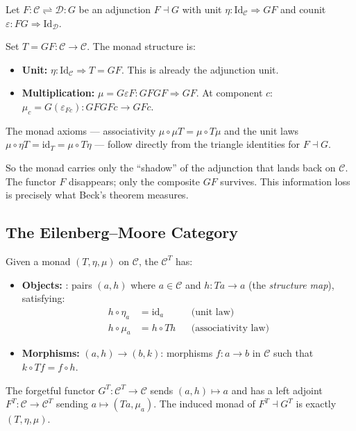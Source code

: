 Let $F : \mathcal{C} \rightleftharpoons \mathcal{D} : G$ be an adjunction
$F \dashv G$ with unit $\eta : \mathrm{Id}_\mathcal{C} \Rightarrow GF$ and
counit $\varepsilon : FG \Rightarrow \mathrm{Id}_\mathcal{D}$.

Set $T = GF : \mathcal{C} \to \mathcal{C}$. The monad structure is:
\begin{itemize}
  \item \textbf{Unit:} $\eta : \mathrm{Id}_\mathcal{C} \Rightarrow T = GF$.
        This is already the adjunction unit.
  \item \textbf{Multiplication:} $\mu = G\varepsilon F : GFGF \Rightarrow GF$.
        At component $c$: $\mu_c = G(\varepsilon_{Fc}) : GF GF c \to GF c$.
\end{itemize}
The monad axioms --- associativity $\mu \circ \mu T = \mu \circ T \mu$ and
the unit laws $\mu \circ \eta T = \mathrm{id}_T = \mu \circ T\eta$ ---
follow directly from the triangle identities for $F \dashv G$.

\begin{dialog}
So the monad carries only the ``shadow'' of the adjunction that lands back
on $\mathcal{C}$. The functor $F$ disappears; only the composite $GF$
survives. This information loss is precisely what Beck's theorem measures.
\end{dialog}

\subsection{The Eilenberg--Moore Category}

Given a monad $(T,\eta,\mu)$ on $\mathcal{C}$, the
 $\mathcal{C}^T$ has:
\begin{itemize}
  \item \textbf{Objects:} : pairs $(a, h)$ where
        $a \in \mathcal{C}$ and $h : Ta \to a$ (the \emph{structure map}),
        satisfying:
        \begin{align*}
          h \circ \eta_a &= \mathrm{id}_a & &\text{(unit law)} \\
          h \circ \mu_a &= h \circ Th & &\text{(associativity law)}
        \end{align*}
  \item \textbf{Morphisms:} $(a,h) \to (b,k)$: morphisms $f : a \to b$
        in $\mathcal{C}$ such that $k \circ Tf = f \circ h$.
\end{itemize}
The forgetful functor $G^T : \mathcal{C}^T \to \mathcal{C}$ sends $(a,h)
\mapsto a$ and has a left adjoint $F^T : \mathcal{C} \to \mathcal{C}^T$
sending $a \mapsto (Ta, \mu_a)$. The induced monad of $F^T \dashv G^T$ is
exactly $(T,\eta,\mu)$.

